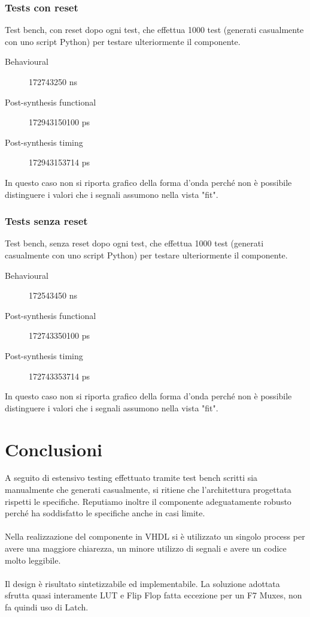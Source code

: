 \documentclass{article}
\begin{document}
\subsubsection{Tests con reset}
Test bench, con reset dopo ogni test, che effettua 1000 test (generati casualmente con uno script Python) per testare ulteriormente il componente.
\begin{description}
	\item[Behavioural] 172743250 ns
	\item[Post-synthesis functional] 172943150100 ps
	\item[Post-synthesis timing] 172943153714 ps
\end{description}
In questo caso non si riporta grafico della forma d'onda perché non è possibile distinguere i valori che i segnali assumono nella vista "fit".

\subsubsection{Tests senza reset}
Test bench, senza reset dopo ogni test, che effettua 1000 test (generati casualmente con uno script Python) per testare ulteriormente il componente.
\begin{description}
	\item[Behavioural] 172543450 ns
	\item[Post-synthesis functional] 172743350100 ps
	\item[Post-synthesis timing] 172743353714 ps
\end{description}
In questo caso non si riporta grafico della forma d'onda perché non è possibile distinguere i valori che i segnali assumono nella vista "fit".
\pagebreak

\section{Conclusioni}
A seguito di estensivo testing effettuato tramite test bench scritti sia manualmente che generati casualmente, si ritiene che l’architettura progettata rispetti le specifiche. Reputiamo inoltre il componente adeguatamente robusto perché ha soddisfatto le specifiche anche in casi limite.
\\
\\
Nella realizzazione del componente in VHDL si è utilizzato un singolo process per avere una maggiore chiarezza, un minore utilizzo di segnali e avere un codice molto leggibile.
\\
\\
Il design è risultato sintetizzabile ed implementabile. La soluzione adottata sfrutta quasi interamente LUT e Flip Flop fatta eccezione per un F7 Muxes, non fa quindi uso di Latch.
\\

\end{document}
